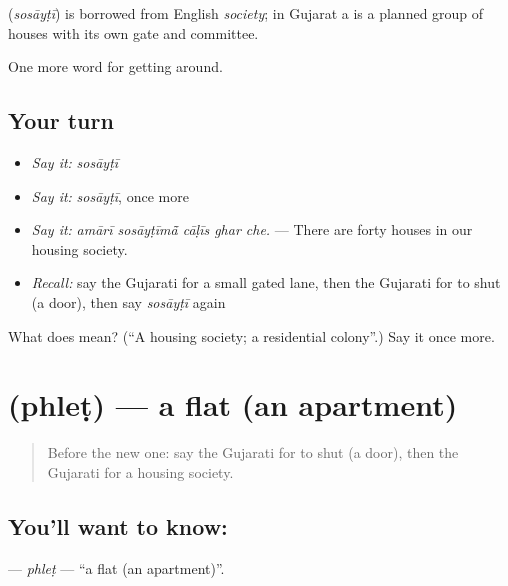 \begin{cousinweb}
\textbf{} (\emph{sosāyṭī}) is borrowed from English \emph{society}; in Gujarat a  is a planned group of houses with its own gate and committee.
\end{cousinweb}

\begin{grammarlens}[title={What you've built}]
One more word for getting around.
\end{grammarlens}

\subsection*{Your turn}
\begin{itemize}
\raggedright
  \item \emph{Say it:} \emph{sosāyṭī}
  \item \emph{Say it:} \emph{sosāyṭī}, once more
  \item \emph{Say it:} \emph{amārī sosāyṭīmā̃ cāḷīs ghar che.} — There are forty houses in our housing society.
  \item \emph{Recall:} say the Gujarati for a small gated lane, then the Gujarati for to shut (a door), then say \emph{sosāyṭī} again
\end{itemize}

\begin{tcolorbox}[breakable,colback=teal!4,colframe=teal!35!black,title={Before you move on}]
What does  mean? (\textquotedblleft{}A housing society; a residential colony\textquotedblright{}.) Say it once more.
\end{tcolorbox}
\section[\texorpdfstring{\gu{ફ્લેટ} (phleṭ)}{ફ્લેટ (phleṭ)}]{ (phleṭ) — a flat (an apartment)}

\label{lesson:GU-C418-phlet}



\begin{quote}
Before the new one: say the Gujarati for to shut (a door), then the Gujarati for a housing society.
\end{quote}

\subsection*{You'll want to know: }
\textbf{} — \emph{phleṭ} — \textquotedblleft{}a flat (an apartment)\textquotedblright{}.

